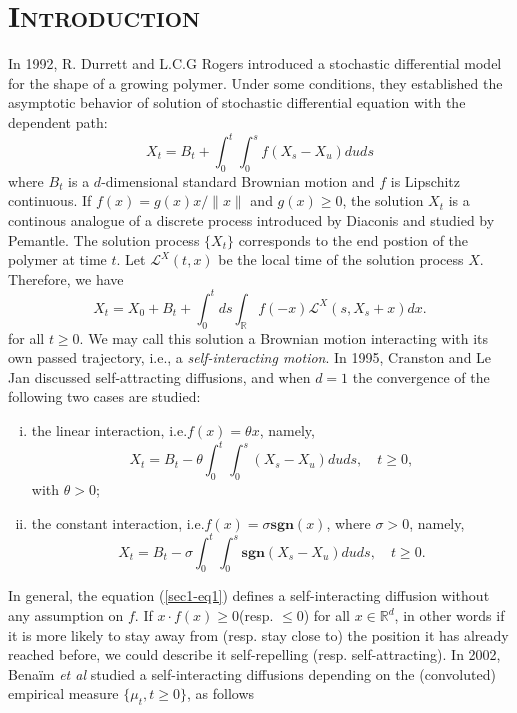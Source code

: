 \documentclass[11pt]{amsart}
\theoremstyle{plain}
\numberwithin{equation}{section}
\begin{document}
\section{\textsc{Introduction}}
In 1992, R. Durrett and L.C.G Rogers introduced a stochastic differential model for the shape of a growing polymer\cite{Durrett}. Under some conditions, they established the asymptotic behavior of solution of stochastic diﬀerential equation with the dependent path:
\begin{equation}\label{sec1-eq1}
X_t = B_t +\int_0^t \int_0^s f(X_s-X_u)duds
\end{equation}
where $B_t$ is a $d$-dimensional standard Brownian motion and $f$ is Lipschitz continuous. If $f(x)=g(x)x/ \|x\|$ and $g(x) \geq 0$, the solution $X_t$ is a continous analogue of a discrete process introduced by Diaconis and studied by Pemantle\cite{Pemantle}. The solution process $\{X_t\}$ corresponds to the end postion of the polymer at time $t$. Let $\mathscr{L}^X(t,x)$ be the local time of the solution process $X$. Therefore, we have 
$$
X_t = X_0 + B_t+\int_0^t ds \int_\mathbb{R}f(-x)\mathscr{L}^X(s,X_s+x)dx.
$$
for all $t\geq 0$. We may call this solution a Brownian motion interacting with its own passed trajectory, i.e., a \emph{self-interacting motion}. In 1995, Cranston and Le Jan\cite{Cranston} discussed self-attracting diffusions, and when $d=1$ the convergence of the following two cases are studied:
\begin{enumerate}[(i)]
  \item the linear interaction, i.e.$ f(x) = \theta x $, namely,
  \begin{equation*}
X_t=B_t-\theta\int_0^t\int_0^s(X_s-X_u)duds,\quad t\geq 0,
  \end{equation*}
  with $\theta>0$;
  \item the constant interaction, i.e.$f(x) = \sigma \textbf{sgn}(x)$, where $\sigma >0$, namely,
  \begin{equation*}
X_t=B_t-\sigma\int_0^t\int_0^s \textbf{sgn}(X_s-X_u)duds,\quad t\geq 0.
  \end{equation*}
\end{enumerate}
In general, the equation (\ref{sec1-eq1}) defines a self-interacting diffusion without any assumption on $f$. If $x \cdot f(x) \geq 0$(resp. $\leq 0$) for all $x \in \mathbb{R}^d$, in other words if it is more likely to stay away from (resp. stay close to) the position it has already reached before, we could describe it self-repelling (resp. self-attracting). In 2002, Bena\"{i}m \emph{ et al}\cite{Benaim} studied a self-interacting diffusions depending on the (convoluted) empirical measure $\{\mu_t,t\geq 0 \}$, as follows
\end{document}
